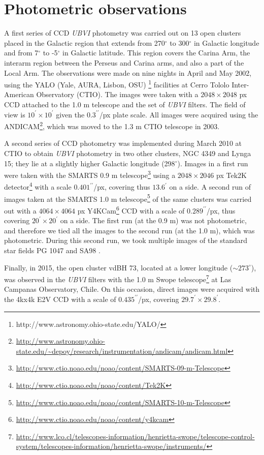 \documentclass[draft]{aa}
\begin{document}
\section{Photometric observations}
\label{sec:photo_obs}

A first series of CCD \emph{UBVI} photometry was carried out on 13 open clusters
placed in the Galactic region that extends from 270$^\circ$ to 300$^\circ$ in Galactic
longitude and from 7$^\circ$ to -5$^\circ$ in Galactic latitude. This region
covers the Carina Arm, the interarm region between the Perseus and Carina arms,
and also a part of the Local Arm.
%
The observations were made on nine nights in April and May 2002, using the YALO
(Yale, AURA, Lisbon, OSU)
\footnote{http://www.astronomy.ohio-state.edu/YALO/}
facilities at Cerro Tololo Inter-American
Observatory (CTIO). The images were taken with a $2048\times2048$ px CCD
attached to the 1.0 m telescope and the set of \textit{UBVI} filters.
The field of view is $10^\prime\times10^\prime$ given the
$0.3^{\prime\prime}$/px plate scale. All images were acquired using the
ANDICAM\footnote{\url{http://www.astronomy.ohio-state.edu/~depoy/research/instrumentation/andicam/andicam.html}},
which was moved to the 1.3 m CTIO telescope in 2003.

A second series of CCD photometry was implemented during March 2010 at CTIO
to obtain \textit{UBVI} photometry in two other clusters,
NGC 4349 and Lynga 15; they lie at a slightly higher Galactic longitude 
(298$^\circ$). Images in a first run were taken with the
SMARTS 0.9 m telescope\footnote{
\url{http://www.ctio.noao.edu/noao/content/SMARTS-09-m-Telescope}}
using a $2048\times2046$ px Tek2K
detector\footnote{\url{http://www.ctio.noao.edu/noao/content/Tek2K}} with a
scale $0.401^{\prime\prime}$/px, covering thus $13.6^{\prime}$ on a side. A
second run of images taken at the SMARTS 1.0 m telescope\footnote{
\url{http://www.ctio.noao.edu/noao/content/SMARTS-10-m-Telescope}}
of the same clusters was carried out with a $4064\times4064$ px
Y4KCam\footnote{\url{http://www.ctio.noao.edu/noao/content/y4kcam}}
CCD with a scale of $0.289^{\prime\prime}$/px, thus covering
$20^\prime\times20^\prime$ on a side.
%
The first run (at the 0.9 m) was not photometric, and therefore we tied all
the images to the second run (at the 1.0 m), which was photometric. During
this second run, we took multiple images of the standard star fields PG 1047
and SA98 \citep{1992AJ....104..340L}.

Finally, in 2015, the open cluster vdBH 73, located at a lower
longitude ($\sim 273^\circ$), was observed in the \textit{UBVI} filters with the
1.0 m Swope telescope\footnote{\url{http://www.lco.cl/telescopes-information/henrietta-swope/telescope-control-system/telescopes-information/henrietta-swope/instruments/}}
at Las Campanas Observatory, Chile. On this occasion,
direct images were acquired with the 4kx4k E2V CCD with a scale of
$0.435^{\prime\prime}$/px, covering $29.7^\prime\times29.8^\prime$.\\
\end{document}

